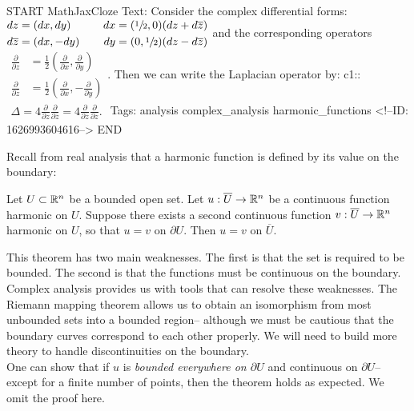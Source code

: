 \documentclass{memoir}
\begin{document}
\begin{anki}
START
MathJaxCloze
Text: Consider the complex differential forms:
\(\begin{align*}
  	dz &= (dx,dy) & \quad dx &= (\sfrac{1}{2},0)(dz + d\overline{z}) \\
  	d \overline{z} &= (dx,-dy) &\quad \,d y &= (0,\sfrac{1}{2})(dz - d \overline{z})
  \end{align*}\)
  and the corresponding operators
  \(\begin{align*}
    	\frac{\partial }{\partial z} &= \frac{1}{2}\left( \frac{\partial }{\partial x} , \frac{\partial }{\partial y}  \right)\\
    	\frac{\partial }{\partial \overline{z}} &= \frac{1}{2} \left( \frac{\partial }{\partial x} , - \frac{\partial }{\partial y}  \right) 
    \end{align*}\). Then we can write the Laplacian operator by:
    {{c1::\(\begin{align*}
	    	\Delta = 4 \frac{\partial }{\partial z} \frac{\partial }{\partial \overline{z}} = 4 \frac{\partial }{\partial \overline{z}} \frac{\partial }{\partial z} .
	    \end{align*}\)}} 
Tags: analysis complex_analysis harmonic_functions
<!--ID: 1626993604616-->
END
\end{anki}

Recall from real analysis that a harmonic function is defined by its value on the boundary:
\begin{thm}
	Let \(U\subset \mathbb{R}^n\) be a bounded open set. Let \(u:\overline{U}\to \mathbb{R}^{n}\) be a continuous function harmonic on \(U\). Suppose there exists a second continuous function \(v:\overline{U}\to \mathbb{R}^{n}\) harmonic on \(U\), so that \(u = v\) on \(\partial U\). Then \(u=v\) on \(\overline{U}\).
\end{thm}
This theorem has two main weaknesses. The first is that the set is required to be bounded. The second is that the functions must be continuous on the boundary.\\

Complex analysis provides us with tools that can resolve these weaknesses. The Riemann mapping theorem allows us to obtain an isomorphism from most unbounded sets into a bounded region-- although we must be cautious that the boundary curves correspond to each other properly. We will need to build more theory to handle discontinuities on the boundary.\\

One can show that if \(u\) is \textit{bounded everywhere on \(\partial U\)} and continuous on \(\partial U\)-- except for a finite number of points, then the theorem holds as expected. We omit the proof here.\\
\end{document}
